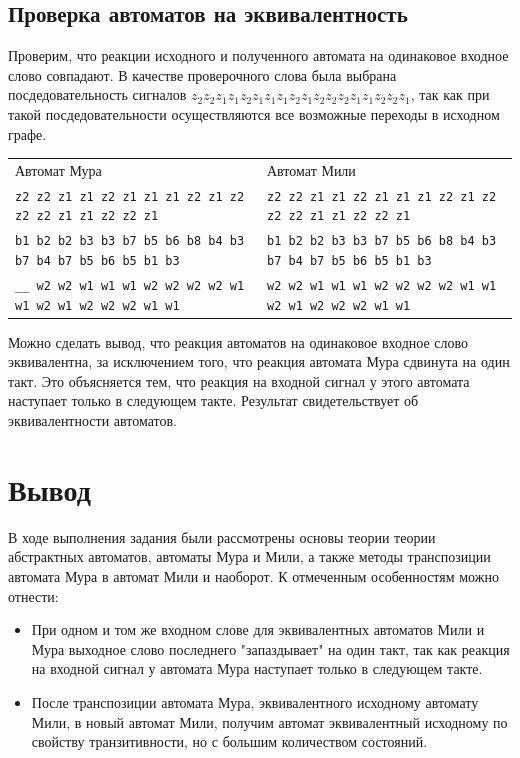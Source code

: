 \documentclass[12pt, a4paper]{article}
\begin{document}
\subsection*{Проверка автоматов на эквивалентность}

Проверим, что реакции исходного и полученного автомата на одинаковое входное
слово совпадают. В качестве проверочного слова была выбрана посдедовательность
сигналов \texttt{$z_2 z_2 z_1 z_1 z_2 z_1 z_1 z_1 z_2 z_1 z_2 z_2 z_2 z_1 z_1
  z_2 z_2 z_1$}, так как при такой посдедовательности осуществляются все
возможные переходы в исходном графе.

\noindent
\begin{scriptsize}
\begin{tabular}{ l | l }
  \normalsize{Автомат Мура} & \normalsize{Автомат Мили} \\
  \texttt{z2 z2 z1 z1 z2 z1 z1 z1 z2 z1 z2 z2 z2 z1 z1 z2 z2 z1} & 
    \texttt{z2 z2 z1 z1 z2 z1 z1 z1 z2 z1 z2 z2 z2 z1 z1 z2 z2 z1} \\
  \texttt{b1 b2 b2 b3 b3 b7 b5 b6 b8 b4 b3 b7 b4 b7 b5 b6 b5 b1 b3} &
    \texttt{b1 b2 b2 b3 b3 b7 b5 b6 b8 b4 b3 b7 b4 b7 b5 b6 b5 b1 b3} \\
  \texttt{\_\_ w2 w2 w1 w1 w1 w2 w2 w2 w2 w1 w1 w2 w1 w2 w2 w2 w1 w1} &
    \texttt{w2 w2 w1 w1 w1 w2 w2 w2 w2 w1 w1 w2 w1 w2 w2 w2 w1 w1}
\end{tabular}
\end{scriptsize}

Можно сделать вывод, что реакция автоматов на одинаковое входное слово
эквивалентна, за исключением того, что реакция автомата Мура сдвинута на один
такт. Это объясняется тем, что реакция на входной сигнал у этого автомата
наступает только в следующем такте. Результат свидетельствует об эквивалентности
автоматов.

\section*{Вывод}

В ходе выполнения задания были рассмотрены основы теории теории абстрактных
автоматов, автоматы Мура и Мили, а также методы транспозиции автомата Мура в
автомат Мили и наоборот. К отмеченным особенностям можно отнести:

\begin{itemize}
  \item При одном и том же входном слове для эквивалентных автоматов Мили и
    Мура выходное слово последнего "запаздывает" на один такт, так как реакция
    на входной сигнал у автомата Мура наступает только в следующем такте.
  \item После транспозиции автомата Мура, эквивалентного исходному автомату
    Мили, в новый автомат Мили, получим автомат эквивалентный исходному по
    свойству транзитивности, но с большим количеством состояний.
\end{itemize}
\end{document}
